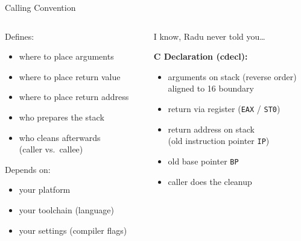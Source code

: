 \documentclass[beamer]{uibk}
\begin{document}
\begin{frame}{Calling Convention}
    \begin{columns}
        \begin{column}{0.5\textwidth}
            Defines:

            \begin{itemize}
                \item where to place arguments
                \item where to place return value
                \item where to place return address
                \item who prepares the stack
                \item who cleans afterwards\\
                    (caller vs.\ callee)
            \end{itemize}

            \pause

            Depends on:

            \begin{itemize}
                \item your platform
                \item your toolchain (language)
                \item your settings (compiler flags)
            \end{itemize}

        \end{column}

        \pause

        \begin{column}{0.5\textwidth}
            I know, Radu never told you\dots

            \medskip

            \textbf{C Declaration (cdecl):}

            \begin{itemize}
                \item arguments on stack (reverse order)\\
                    aligned to \SI{16}{\byte} boundary
                \item return via register (\texttt{EAX} / \texttt{ST0})
                \item return address on stack\\
                    (old instruction pointer \texttt{IP})
                \item old base pointer \texttt{BP}
                \item caller does the cleanup
            \end{itemize}
        \end{column}
    \end{columns}
\end{frame}
\end{document}
